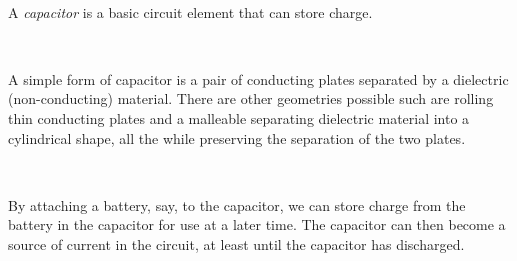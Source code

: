 \documentclass{article}
\begin{document}
\


A \textit{capacitor} is a basic circuit element that can store charge. 

\

A simple form of capacitor is a pair of conducting plates separated by a dielectric (non-conducting) material. There are other geometries possible such are rolling thin conducting plates and a malleable separating dielectric material into a cylindrical shape, all the while preserving the separation of the two plates. 

\

By attaching a battery, say, to the capacitor, we can store charge from the battery in the capacitor for use at a later time. The capacitor can then become a source of current in the circuit, at least until the capacitor has discharged.
\end{document}
